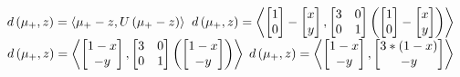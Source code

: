 \documentclass[a4paper,11pt]{article}
\begin{document}
\begin{mlsolution}
\begin{math}
d\left ( \mu_{+}, \space z \right ) = \left \langle \mu_{+} - z, \space U\left ( \mu_{+} - z \right ) \right \rangle
\end{math}
\newline
\newline
\begin{math}
d\left ( \mu_{+}, \space z \right ) = \left \langle \begin{bmatrix} 1\\ 0 \end{bmatrix} - \begin{bmatrix} x\\ y \end{bmatrix} , \begin{bmatrix} 
3 & 0 \\ 0 & 1 \end{bmatrix} \left (  \begin{bmatrix} 1\\ 0 \end{bmatrix} - \begin{bmatrix} x\\ y \end{bmatrix}  \right ) \right \rangle
\end{math}
\newline
\begin{math}
d\left ( \mu_{+}, \space z \right ) = \left \langle \begin{bmatrix} 1-x\\ -y \end{bmatrix} , \begin{bmatrix} 
3 & 0 \\ 0 & 1 \end{bmatrix} \left (  \begin{bmatrix} 1-x\\ -y \end{bmatrix}  \right ) \right \rangle
\end{math}
\newline
\begin{math}
d\left ( \mu_{+}, \space z \right ) = \left \langle \begin{bmatrix} 1-x\\ -y \end{bmatrix} , \begin{bmatrix} 3*(1-x) \\ -y \end{bmatrix} \right \rangle
\\
\end{math}
\begin{math}

\end{math}
\end{mlsolution}
\end{document}
